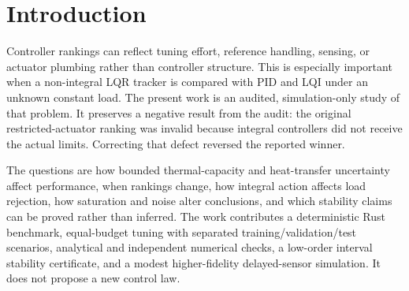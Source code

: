 \section{Introduction}\label{sec:introduction}
Controller rankings can reflect tuning effort, reference handling, sensing, or actuator plumbing rather than controller structure. This is especially important when a non-integral LQR tracker is compared with PID and LQI under an unknown constant load. The present work is an audited, simulation-only study of that problem. It preserves a negative result from the audit: the original restricted-actuator ranking was invalid because integral controllers did not receive the actual limits. Correcting that defect reversed the reported winner.

The questions are how bounded thermal-capacity and heat-transfer uncertainty affect performance, when rankings change, how integral action affects load rejection, how saturation and noise alter conclusions, and which stability claims can be proved rather than inferred. The work contributes a deterministic Rust benchmark, equal-budget tuning with separated training/validation/test scenarios, analytical and independent numerical checks, a low-order interval stability certificate, and a modest higher-fidelity delayed-sensor simulation. It does not propose a new control law.

